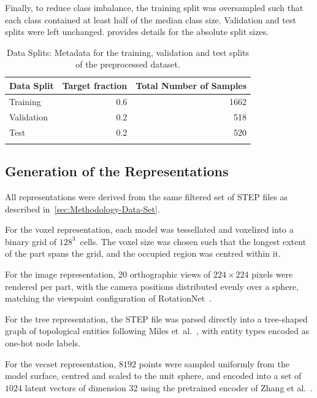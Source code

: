 \documentclass[5p,times,procedia]{elsarticle}
\begin{document}
Finally, to reduce class imbalance, the training split was oversampled such that each class contained at least half of the median class size. Validation and test splits were left unchanged.  provides details for the absolute split sizes.

\begin{table}[h]
\caption{Data Splits: Metadata for the training, validation and test splits of the preprocessed dataset.}
\label{tab:data-splits}
\begin{tabular*}{\hsize}{@{\extracolsep{\fill}}lrr@{}}
\toprule
    Data Split & Target fraction & Total Number of Samples\\
    \hline
    Training & 0.6 & 1662\\
    Validation & 0.2 & 518\\
    Test & 0.2 & 520\\
\botrule
\end{tabular*}
\end{table}

\subsection{Generation of the Representations}\label{sec:Methodology-Representations}
All representations were derived from the same filtered set of STEP files as described in~\cref{sec:Methodology-Data-Set}.

For the voxel representation, each model was tessellated and voxelized into a binary grid of $128^3$~cells.
The voxel size was chosen such that the longest extent of the part spans the grid, and the occupied region was centred within it.

For the image representation, 20 orthographic views of $224\times224$ pixels were rendered per part, with the camera positions distributed evenly over a sphere, matching the viewpoint configuration of RotationNet~\cite{kanezaki2018rotationnet}.

For the tree representation, the STEP file was parsed directly into a tree-shaped graph of topological entities following Miles et\ al.~\cite{miles2023recursive}, with entity types encoded as one-hot node labels.

For the vecset representation, $8192$ points were sampled uniformly from the model surface, centred and scaled to the unit sphere, and encoded into a set of $1024$ latent vectors of dimension 32 using the pretrained encoder of Zhang et al.~\cite{zhang20233dshape2vecset}.
\end{document}
